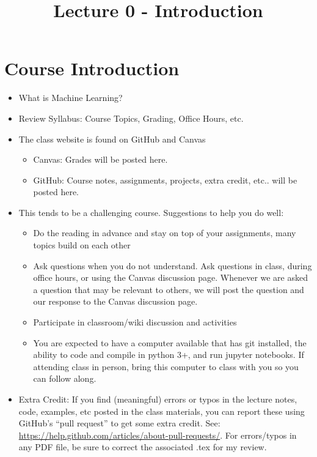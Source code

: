 \documentclass[11pt]{amsart}
\title{Lecture 0  - Introduction }
\begin{document}
\maketitle

\section{Course Introduction}
\begin{itemize}
	\item What is Machine Learning? 
	\item Review Syllabus: Course Topics, Grading, Office Hours, etc.
	\item The class website is found on GitHub and Canvas
	\begin{itemize}
		\item Canvas: Grades will be posted here. 
		\item GitHub: Course notes, assignments, projects, extra credit, etc.. will be posted here. 
	\end{itemize}
	\item This tends to be a challenging course.  Suggestions to help you do well: 
	\begin{itemize}
		\item Do the reading in advance and stay on top of your assignments, many topics build on each other 
		\item Ask questions when you do not understand. Ask questions in class, during office hours, or using the Canvas discussion page.  Whenever we are asked a question that may be relevant to others, we will post the question and our response to the Canvas discussion page. 
		\item Participate in classroom/wiki discussion and activities
		\item You are expected to have a computer available that has git installed, the ability to code and compile in python 3+, and run jupyter notebooks.  If attending class in person, bring this computer to class with you so you can follow along. 
	\end{itemize}
	\item Extra Credit: If you find (meaningful) errors or typos in the lecture notes, code, examples, etc posted in the class materials, you can report these using GitHub's ``pull request'' to get some extra credit.  See: \url{https://help.github.com/articles/about-pull-requests/}.  For errors/typos in any PDF file, be sure to correct the associated .tex for my review. 
\end{itemize}
\end{document}
